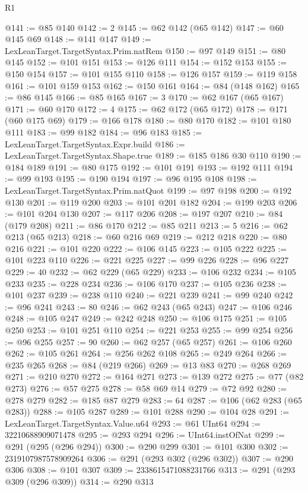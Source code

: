 \begin{lexlean}{R1}
\begin{coremodule}
@141 := @85 @140
@142 := 2
@145 := @62 @142 (@65 @142)
@147 := @60 @145 @69
@148 := @141 @147
@149 := LexLeanTarget.TargetSyntax.Prim.natRem
@150 := @97 @149
@151 := @80 @145
@152 := @101 @151
@153 := @126 @111
@154 := @152 @153
@155 := @150 @154
@157 := @101 @155 @110
@158 := @126 @157
@159 := @119 @158
@161 := @101 @159 @153
@162 := @150 @161
@164 := @84 (@148 @162)
@165 := @86 @145
@166 := @85 @165
@167 := 3
@170 := @62 @167 (@65 @167)
@171 := @60 @170
@172 := 4
@175 := @62 @172 (@65 @172)
@178 := @171 (@60 @175 @69)
@179 := @166 @178
@180 := @80 @170
@182 := @101 @180 @111
@183 := @99 @182
@184 := @96 @183
@185 := LexLeanTarget.TargetSyntax.Expr.build
@186 := LexLeanTarget.TargetSyntax.Shape.true
@189 := @185 @186 @30 @110
@190 := @184 @189
@191 := @80 @175
@192 := @101 @191
@193 := @192 @111
@194 := @99 @193
@195 := @190 @194
@197 := @96 @195 @108
@198 := LexLeanTarget.TargetSyntax.Prim.natQuot
@199 := @97 @198
@200 := @192 @130
@201 := @119 @200
@203 := @101 @201 @182
@204 := @199 @203
@206 := @101 @204 @130
@207 := @117 @206
@208 := @197 @207
@210 := @84 (@179 @208)
@211 := @86 @170
@212 := @85 @211
@213 := 5
@216 := @62 @213 (@65 @213)
@218 := @60 @216 @69
@219 := @212 @218
@220 := @80 @216
@221 := @101 @220
@222 := @106 @145
@223 := @105 @222
@225 := @101 @223 @110
@226 := @221 @225
@227 := @99 @226
@228 := @96 @227
@229 := 40
@232 := @62 @229 (@65 @229)
@233 := @106 @232
@234 := @105 @233
@235 := @228 @234
@236 := @106 @170
@237 := @105 @236
@238 := @101 @237
@239 := @238 @110
@240 := @221 @239
@241 := @99 @240
@242 := @96 @241
@243 := 80
@246 := @62 @243 (@65 @243)
@247 := @106 @246
@248 := @105 @247
@249 := @242 @248
@250 := @106 @175
@251 := @105 @250
@253 := @101 @251 @110
@254 := @221 @253
@255 := @99 @254
@256 := @96 @255
@257 := 90
@260 := @62 @257 (@65 @257)
@261 := @106 @260
@262 := @105 @261
@264 := @256 @262 @108
@265 := @249 @264
@266 := @235 @265
@268 := @84 (@219 @266)
@269 := @13 @83
@270 := @268 @269
@271 := @210 @270
@272 := @164 @271
@273 := @139 @272
@275 := @77 (@82 @273)
@276 := @57 @275
@278 := @58 @69 @14
@279 := @72 @92
@280 := @278 @279
@282 := @185 @87 @279
@283 := 64
@287 := @106 (@62 @283 (@65 @283))
@288 := @105 @287
@289 := @101 @288
@290 := @104 @28
@291 := LexLeanTarget.TargetSyntax.Value.u64
@293 := @61 UInt64
@294 := 32210688909071478
@295 := @293 @294
@296 := UInt64.instOfNat
@299 := @291 (@295 (@296 @294))
@300 := @290 @299
@301 := @101 @300
@302 := 2319107987578909264
@306 := @291 (@293 @302 (@296 @302))
@307 := @290 @306
@308 := @101 @307
@309 := 2338615471088231766
@313 := @291 (@293 @309 (@296 @309))
@314 := @290 @313

\end{coremodule}
\end{lexlean}
